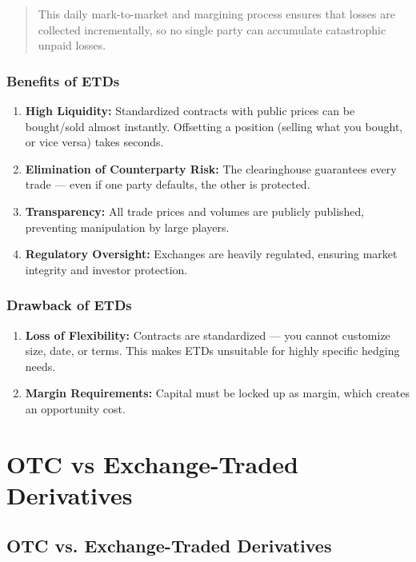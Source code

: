 \documentclass[12pt,openany]{book}
\begin{document}
\begin{quote}
    This daily mark-to-market and margining process ensures that losses are collected incrementally, so no single party can accumulate catastrophic unpaid losses.
\end{quote}

\subsubsection{Benefits of ETDs}

\begin{enumerate}[leftmargin=*]
    \item \textbf{High Liquidity:} Standardized contracts with public prices can be bought/sold almost instantly. Offsetting a position (selling what you bought, or vice versa) takes seconds.
    \item \textbf{Elimination of Counterparty Risk:} The clearinghouse guarantees every trade --- even if one party defaults, the other is protected.
    \item \textbf{Transparency:} All trade prices and volumes are publicly published, preventing manipulation by large players.
    \item \textbf{Regulatory Oversight:} Exchanges are heavily regulated, ensuring market integrity and investor protection.
\end{enumerate}

\subsubsection{Drawback of ETDs}

\begin{enumerate}[leftmargin=*]
    \item \textbf{Loss of Flexibility:} Contracts are standardized --- you cannot customize size, date, or terms. This makes ETDs unsuitable for highly specific hedging needs.
    \item \textbf{Margin Requirements:} Capital must be locked up as margin, which creates an opportunity cost.
\end{enumerate}

\section{OTC vs Exchange-Traded Derivatives}

\subsection{OTC vs. Exchange-Traded Derivatives}
\end{document}

